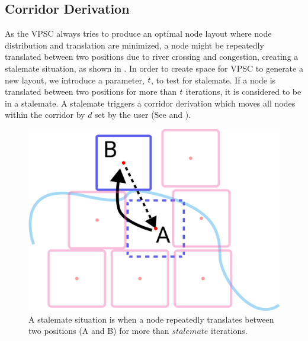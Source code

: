 \subsection{Corridor Derivation}

As the VPSC always tries to produce an optimal node layout where node distribution and translation are minimized, a node might be repeatedly translated between two positions due to river crossing and congestion, creating a stalemate situation, as shown in . In order to create space for VPSC to generate a new layout, we introduce a parameter, $ t $, to test for stalemate. If a node is translated between two positions for more than $ t $ iterations, it is considered to be in a stalemate. A stalemate triggers a corridor derivation which moves all nodes within the corridor by $ d $ set by the user (See  and ).

{
\begin{figure}[tb!]
    \centering
    \includegraphics[width=\columnwidth]{figure/stalemate.png}
    \caption{A stalemate situation is when a node repeatedly translates between two positions (A and B) for more than $ stalemate $ iterations. }
    \label{fig:stalemate}
\end{figure}
}

